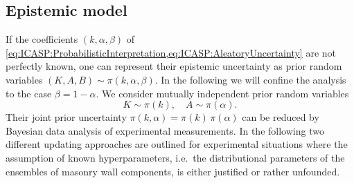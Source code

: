 \subsection{Epistemic model}
If the coefficients \((k,\alpha,\beta)\) of \cref{eq:ICASP:ProbabilisticInterpretation,eq:ICASP:AleatoryUncertainty} are not perfectly known,
one can represent their epistemic uncertainty as prior random variables \((K,A,B) \sim \pi(k,\alpha,\beta)\).
In the following we will confine the analysis to the case \(\beta = 1-\alpha\).
We consider mutually independent prior random variables
\begin{equation} \label{eq:ICASP:EpistemicUncertainty}
  K \sim \pi(k), \quad A \sim \pi(\alpha).
\end{equation}
Their joint prior uncertainty \(\pi(k,\alpha) = \pi(k) \, \pi(\alpha)\) can be reduced by Bayesian data analysis of experimental measurements.
In the following two different updating approaches are outlined for experimental situations where the assumption of known hyperparameters,
i.e.\ the distributional parameters of the ensembles of masonry wall components, is either justified or rather unfounded.

